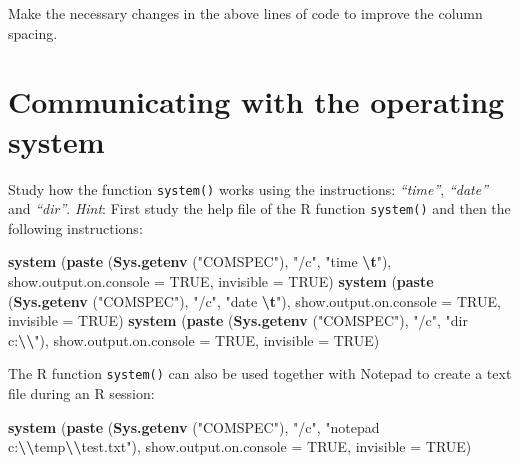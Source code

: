 \documentclass[
]{book}
\newenvironment{Shaded}{\begin{snugshade}}{\end{snugshade}}
\newcommand{\AttributeTok}[1]{\textcolor[rgb]{0.13,0.29,0.53}{#1}}
\newcommand{\ConstantTok}[1]{\textcolor[rgb]{0.56,0.35,0.01}{#1}}
\newcommand{\FunctionTok}[1]{\textcolor[rgb]{0.13,0.29,0.53}{\textbf{#1}}}
\newcommand{\NormalTok}[1]{#1}
\newcommand{\SpecialCharTok}[1]{\textcolor[rgb]{0.81,0.36,0.00}{\textbf{#1}}}
\newcommand{\StringTok}[1]{\textcolor[rgb]{0.31,0.60,0.02}{#1}}
\begin{document}
Make the necessary changes in the above lines of code to improve the column spacing.

\section{Communicating with the operating system}\label{communicating-with-the-operating-system}

Study how the function \texttt{system()} works using the instructions: \emph{``time''}, \emph{``date''} and \emph{``dir''}. \emph{Hint}: First study the help file of the R function \texttt{system()} and then the following instructions:

\begin{Shaded}
\begin{Highlighting}[]
\FunctionTok{system}\NormalTok{ (}\FunctionTok{paste}\NormalTok{ (}\FunctionTok{Sys.getenv}\NormalTok{ (}\StringTok{"COMSPEC"}\NormalTok{), }\StringTok{"/c"}\NormalTok{, }\StringTok{"time }\SpecialCharTok{\textbackslash{}t}\StringTok{"}\NormalTok{),                      }
         \AttributeTok{show.output.on.console =} \ConstantTok{TRUE}\NormalTok{, }\AttributeTok{invisible =} \ConstantTok{TRUE}\NormalTok{)}
\FunctionTok{system}\NormalTok{ (}\FunctionTok{paste}\NormalTok{ (}\FunctionTok{Sys.getenv}\NormalTok{ (}\StringTok{"COMSPEC"}\NormalTok{), }\StringTok{"/c"}\NormalTok{, }\StringTok{"date }\SpecialCharTok{\textbackslash{}t}\StringTok{"}\NormalTok{),                  }
         \AttributeTok{show.output.on.console =} \ConstantTok{TRUE}\NormalTok{, }\AttributeTok{invisible =} \ConstantTok{TRUE}\NormalTok{)}
\FunctionTok{system}\NormalTok{ (}\FunctionTok{paste}\NormalTok{ (}\FunctionTok{Sys.getenv}\NormalTok{ (}\StringTok{"COMSPEC"}\NormalTok{), }\StringTok{"/c"}\NormalTok{, }\StringTok{"dir c:}\SpecialCharTok{\textbackslash{}\textbackslash{}}\StringTok{"}\NormalTok{),                  }
         \AttributeTok{show.output.on.console =} \ConstantTok{TRUE}\NormalTok{, }\AttributeTok{invisible =} \ConstantTok{TRUE}\NormalTok{)}
\end{Highlighting}
\end{Shaded}

The R function \texttt{system()} can also be used together with Notepad to create a text file during an R session:

\begin{Shaded}
\begin{Highlighting}[]
\FunctionTok{system}\NormalTok{ (}\FunctionTok{paste}\NormalTok{ (}\FunctionTok{Sys.getenv}\NormalTok{ (}\StringTok{"COMSPEC"}\NormalTok{), }\StringTok{"/c"}\NormalTok{, }
               \StringTok{"notepad c:}\SpecialCharTok{\textbackslash{}\textbackslash{}}\StringTok{temp}\SpecialCharTok{\textbackslash{}\textbackslash{}}\StringTok{test.txt"}\NormalTok{),}
        \AttributeTok{show.output.on.console =} \ConstantTok{TRUE}\NormalTok{, }\AttributeTok{invisible =} \ConstantTok{TRUE}\NormalTok{)}
\end{Highlighting}
\end{Shaded}
\end{document}
